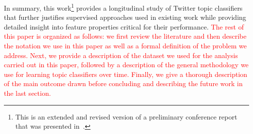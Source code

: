 In summary, this work\footnote{This is an extended and revised version of a preliminary conference report that was presented in~\cite{Iman2017}.} provides a longitudinal study of Twitter topic classifiers that further justifies supervised approaches used in existing work while providing detailed insight into feature properties critical for their performance. \textcolor{red}{ The rest of this paper is organized as follows: 
we first review the literature and then describe the notation we use in this paper as well as a formal definition of the problem we address. Next, we provide a description of the dataset we used for the analysis carried out in this paper, followed by a description of the general methodology we use for learning topic classifiers over time. Finally, we give a thorough description of the main outcome drawn before concluding and describing the future work in the last section.}







%
%



